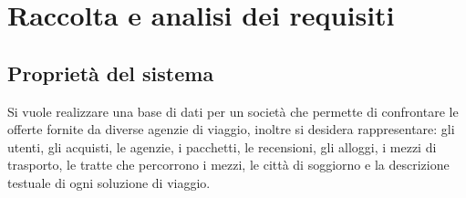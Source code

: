 \section{Raccolta e analisi dei requisiti}
\subsection{Proprietà del sistema}

%
%
Si vuole realizzare una base di dati per un società che permette di confrontare le offerte fornite da diverse agenzie di viaggio, inoltre si desidera rappresentare: gli utenti, gli acquisti, le agenzie, i pacchetti, le recensioni, gli alloggi, i mezzi di trasporto, le tratte che percorrono i mezzi, le città di soggiorno e la descrizione testuale di ogni soluzione di viaggio.

